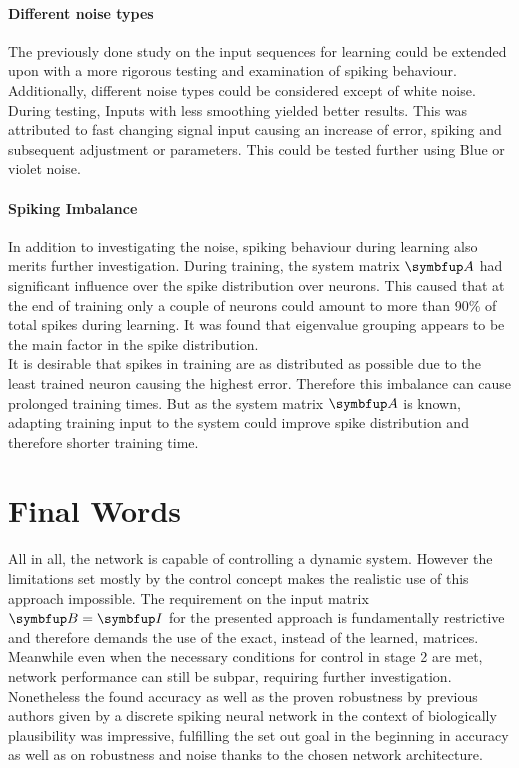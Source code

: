 \paragraph{Different noise types}
The previously done study on the input sequences for learning could be extended upon with a more rigorous testing and examination of spiking behaviour. Additionally, different noise types could be considered except of white noise. During testing, Inputs with less smoothing yielded better results. This was attributed to fast changing signal input causing an increase of error, spiking and subsequent adjustment or parameters. This could be tested further using Blue or violet noise.
\paragraph{Spiking Imbalance}
In addition to investigating the noise, spiking behaviour during learning also merits further investigation. During training, the system matrix $\bmu{A}$ had significant influence over the spike distribution over neurons. This caused that at the end of training only a couple of neurons could amount to more than 90\% of total spikes during learning. It was found that eigenvalue grouping appears to be the main factor in the spike distribution.\\
It is desirable that spikes in training are as distributed as possible due to the least trained neuron causing the highest error. Therefore this imbalance can cause prolonged training times. But as the system matrix $\bmu{A}$ is known, adapting training input to the system could improve spike distribution and therefore shorter training time.\\

\section{Final Words}

All in all, the network is capable of controlling a dynamic system. However the limitations set mostly by the control concept makes the realistic use of this approach impossible. The requirement on the input matrix $\bmu{B} = \bmu{I}$ for the presented approach is fundamentally restrictive and therefore demands the use of the exact, instead of the learned, matrices. Meanwhile even when the necessary conditions for control in stage 2 are met, network performance can still be subpar, requiring further investigation.\\

Nonetheless the found accuracy as well as the proven robustness by previous authors given by a discrete spiking neural network in the context of biologically plausibility was impressive, fulfilling the set out goal in the beginning in accuracy as well as on robustness and noise thanks to the chosen network architecture.\\



